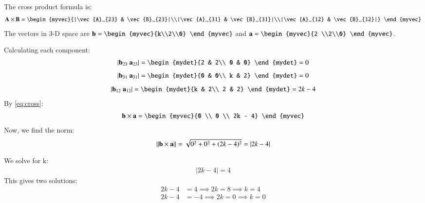 \documentclass[journal]{IEEEtran}
\begin{document}
	The cross product formula is:
	\begin{align}
		\vec{A}\times\vec{B} = \begin{myvec}{|\vec{A}_{23} & \vec{B}_{23}|\\|\vec{A}_{31} & \vec{B}_{31}|\\|\vec{A}_{12} & \vec{B}_{12}|} \end{myvec} \label{eq:cross}
	\end{align}
	 The vectors in 3-D space are $\vec{b} = \begin{myvec}{k\\2\\0} \end{myvec}$ and $\vec{a} = \begin{myvec}{2 \\2\\0} \end{myvec}$.
	 
	 Calculating each component:
	\begin{align}
	|\vec{b}_{23} \text{ } \vec{a}_{23}| = \begin{mydet}{2 & 2\\ 0 & 0} \end{mydet} = 0
	\end{align}
	\begin{align}
	|\vec{b}_{31} \text{ } \vec{a}_{31}| = \begin{mydet}{0 & 0\\ k & 2} \end{mydet} = 0
	\end{align}
	\begin{align}
	|\vec{b}_{12} \text{ } \vec{a}_{12}| = \begin{mydet}{k & 2\\ 2 & 2} \end{mydet} = 2k - 4
	\end{align}
	By \eqref{eq:cross}:
	\begin{align}
		\vec{b}\times\vec{a} = \begin{myvec}{0 \\ 0 \\ 2k - 4} \end{myvec}
	\end{align}
	Now, we find the norm:
	\begin{align}
		\left\lVert\mathbf{b}\times\mathbf{a}\right\rVert = \sqrt{0^2 + 0^2 + (2k-4)^2} = |2k-4|
	\end{align}
	
	We solve for k:
	\begin{align}
		|2k - 4| = 4
	\end{align}
	This gives two solutions:
	\begin{align}
		2k - 4 &= 4 \implies 2k = 8 \implies k = 4 \\
		2k - 4 &= -4 \implies 2k = 0 \implies k = 0
	\end{align}
	
\end{document}
